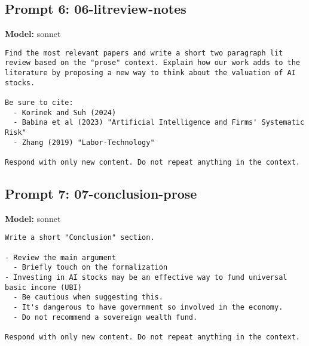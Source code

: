 \subsection*{Prompt 6: 06-litreview-notes}
\textbf{Model:} sonnet
\vspace{0.5em}
\begin{lstlisting}[language=text,breaklines=true,frame=single]
Find the most relevant papers and write a short two paragraph lit review based on the "prose" context. Explain how our work adds to the literature by proposing a new way to think about the valuation of AI stocks.

Be sure to cite:
  - Korinek and Suh (2024)
  - Babina et al (2023) "Artificial Intelligence and Firms' Systematic Risk"
  - Zhang (2019) "Labor-Technology"

Respond with only new content. Do not repeat anything in the context.  

\end{lstlisting}
\vspace{1em}
\subsection*{Prompt 7: 07-conclusion-prose}
\textbf{Model:} sonnet
\vspace{0.5em}
\begin{lstlisting}[language=text,breaklines=true,frame=single]
Write a short "Conclusion" section. 

- Review the main argument 
  - Briefly touch on the formalization
- Investing in AI stocks may be an effective way to fund universal basic income (UBI)
  - Be cautious when suggesting this. 
  - It's dangerous to have government so involved in the economy.
  - Do not recommend a sovereign wealth fund.

Respond with only new content. Do not repeat anything in the context.  

\end{lstlisting}
\vspace{1em}
